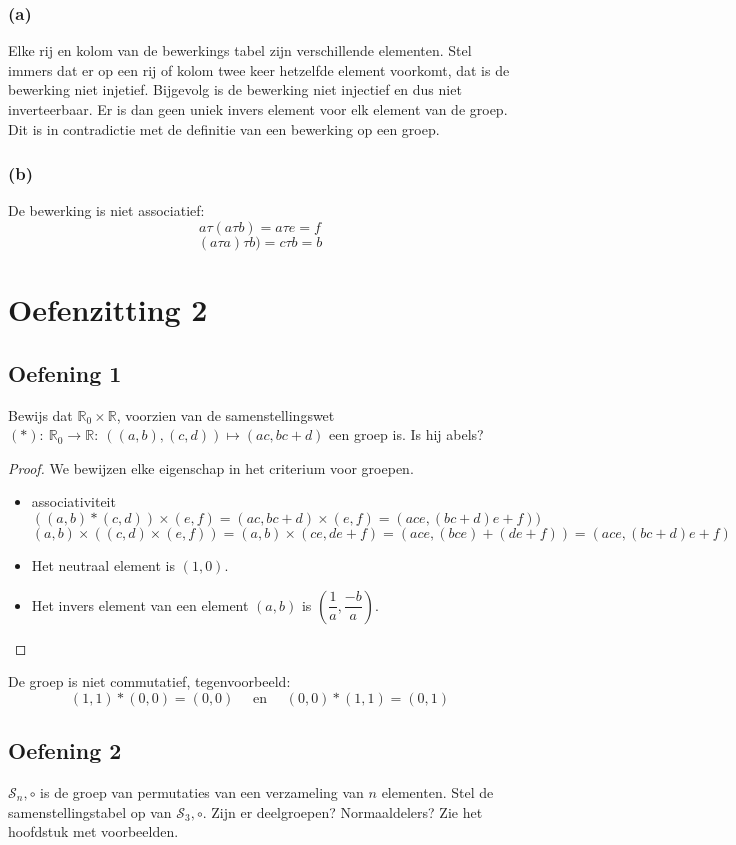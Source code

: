 \documentclass[main.tex]{subfiles}
\begin{document}
\subsubsection*{(a)}
Elke rij en kolom van de bewerkings tabel zijn verschillende elementen.
Stel immers dat er op een rij of kolom twee keer hetzelfde element voorkomt, dat is de bewerking niet injetief.
Bijgevolg is de bewerking niet injectief en dus niet inverteerbaar.
Er is dan geen uniek invers element voor elk element van de groep.
Dit is in contradictie met de definitie van een bewerking op een groep.

\subsubsection*{(b)}
De bewerking is niet associatief:
\[
a \tau (a \tau b)=a \tau e=f
\]
\[
(a \tau a) \tau b)=c \tau b=b
\]

\section{Oefenzitting 2}
\subsection*{Oefening 1}

Bewijs dat $\mathbb{R}_0 \times \mathbb{R}$, voorzien van de samenstellingswet $(*):\ \mathbb{R}_{0}\rightarrow \mathbb{R}:\ ((a,b),(c,d)) \mapsto (ac,bc+d)$ een groep is.
Is hij abels?
\begin{proof} 
We bewijzen elke eigenschap in het criterium voor groepen.
\begin{itemize}
  \item associativiteit
  \[
  ((a,b)*(c,d))\times (e,f)=(ac,bc+d)\times (e,f)=(ace,(bc+d)e+f))
  \]
  \[
  (a,b) \times ((c,d) \times (e,f))=(a,b) \times
  (ce,de+f)=(ace,(bce)+(de+f))=(ace,(bc+d)e+f)
  \]
  \item Het neutraal element is $(1,0)$. 
  \item Het invers element van een element $(a,b)$ is  $(\dfrac{1}{a},\dfrac{-b}{a})$.
\end{itemize}
\end{proof}
De groep is niet commutatief, tegenvoorbeeld:
\[
(1,1)*(0,0) = (0,0) \quad\text{ en }\quad (0,0)*(1,1) = (0,1)
\]

\subsection*{Oefening 2}
$\mathcal{S}_{n},\circ$ is de groep van permutaties van een verzameling van $n$ elementen.
Stel de samenstellingstabel op van $\mathcal{S}_{3},\circ$.
Zijn er deelgroepen?
Normaaldelers? 
Zie het hoofdstuk met voorbeelden.
\end{document}
